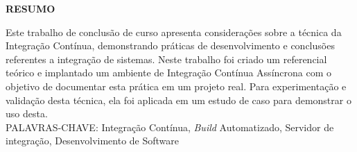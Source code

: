 \begin{center}
\textbf{RESUMO}
\end{center}
\singlespacing

\noindent Este trabalho de conclusão de curso apresenta considerações sobre a técnica da Integração Contínua, demonstrando práticas de desenvolvimento e conclusões referentes a integração de sistemas. Neste trabalho foi criado um referencial teórico e implantado um ambiente de Integração Contínua Assíncrona com o objetivo de documentar esta prática em um projeto real. Para experimentação e validação desta técnica, ela foi aplicada em um estudo de caso para demonstrar o uso desta. \\

\noindent PALAVRAS-CHAVE: Integração Contínua, \textit{Build} Automatizado, Servidor de integração, Desenvolvimento de Software

